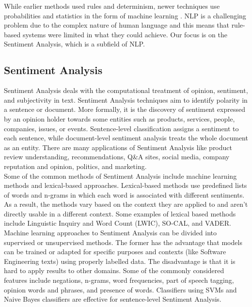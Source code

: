 \documentclass[conference]{IEEEtran}
\begin{document}
While earlier methods used  rules and determinism, newer techniques use probabilities and statistics in the form of machine learning \cite{b8}. NLP is a challenging problem due to the complex nature of human language and this means that rule-based systems were limited in what they could achieve. Our focus is on the Sentiment Analysis, which is a subfield of NLP. \\

\subsection{Sentiment Analysis}
Sentiment Analysis deals with the computational treatment of opinion, sentiment, and subjectivity in text. Sentiment Analysis techniques aim to identify polarity in a sentence or document. More formally, it is the discovery of sentiment expressed by an opinion holder towards some entities such as products, services, people, companies, issues, or events. Sentence-level classification assigns a sentiment to each sentence, while document-level sentiment analysis treats the whole document as an entity. There are many applications of Sentiment Analysis like product review understanding, recommendations, Q\&A sites, social media, company reputation and opinion, politics, and marketing. \cite{b10, b13, b19}\\

Some of the common methods of Sentiment Analysis include machine learning methods and lexical-based approaches. Lexical-based methods use predefined lists of words and n-grams in which each word is associated with different sentiments. As a result, the methods vary based on the context they are applied to and aren't directly usable in a different context. Some examples of lexical based methods include Linguistic Inquiry and Word Count (LWIC), SO-CAL, and VADER.\cite{b11, b13}\\

Machine learning approaches to Sentiment Analysis can be divided into supervised or unsupervised methods. The former has the advantage that models can be trained or adapted for specific purposes and contexts (like Software Engineering texts) using properly labelled data. The disadvantage is that it is hard to apply results to other domains. Some of the commonly considered features include negations, n-grams, word frequencies, part of speech tagging, opinion words and phrases, and presence of words. Classifiers using SVMs and Naive Bayes classifiers are effective for sentence-level Sentiment Analysis.\cite{b11, b13, b14}\\
\end{document}
